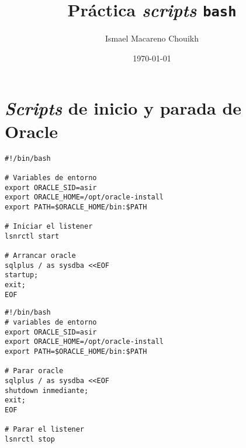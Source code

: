 \documentclass[11pt]{article}
\author{Ismael Macareno Chouikh}
\date{\today}
\title{Práctica \emph{scripts} \texttt{bash}}
\newcommand\blankpage{\null\thispagestyle{empty}\newpage}
\begin{document}
\maketitle
\tableofcontents

\blankpage

\section{\emph{Scripts} de inicio y parada de Oracle}
\label{sec:orga4b3f8a}
\begin{verbatim}
#!/bin/bash

# Variables de entorno
export ORACLE_SID=asir
export ORACLE_HOME=/opt/oracle-install
export PATH=$ORACLE_HOME/bin:$PATH

# Iniciar el listener
lsnrctl start

# Arrancar oracle
sqlplus / as sysdba <<EOF
startup;
exit;
EOF
\end{verbatim}
\begin{verbatim}
#!/bin/bash
# variables de entorno
export ORACLE_SID=asir
export ORACLE_HOME=/opt/oracle-install
export PATH=$ORACLE_HOME/bin:$PATH

# Parar oracle
sqlplus / as sysdba <<EOF
shutdown inmediante;
exit;
EOF

# Parar el listener
lsnrctl stop
\end{verbatim}
\end{document}

